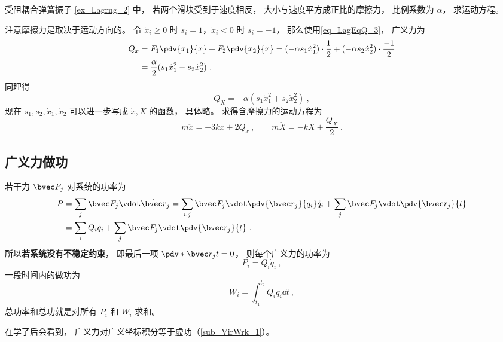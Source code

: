 \begin{example}{受阻耦合弹簧振子}
\autoref{ex_Lagrng_2}  中， 若两个滑块受到于速度相反， 大小与速度平方成正比的摩擦力， 比例系数为 $\alpha$， 求运动方程。

注意摩擦力是取决于运动方向的。 令 $\dot x_i \geqslant 0$ 时 $s_i = 1$，$\dot x_i < 0$ 时 $s_i = -1$， 那么使用\autoref{eq_LagEqQ_3}， 广义力为
\begin{equation}
\begin{aligned}
Q_x &= F_1 \pdv{x_1}{x} + F_2 \pdv{x_2}{x} = (-\alpha s_1\dot x_1^2) \cdot \frac{1}{2} + (-\alpha s_2\dot x_2^2) \cdot \frac{-1}{2}\\
&= \frac{\alpha}{2}(s_1\dot x_1^2 - s_2 \dot x_2^2)~.
\end{aligned}
\end{equation}
同理得
\begin{equation}
Q_X = -\alpha(s_1 \dot x_1^2 + s_2\dot x_2^2)~,
\end{equation}
现在 $s_1,s_2,\dot x_1,\dot x_2$ 可以进一步写成 $\dot x, \dot X$ 的函数， 具体略。 求得含摩擦力的运动方程为
\begin{equation}
m\ddot x =  - 3kx + 2Q_x~, \qquad
m\ddot X =  - kX + \frac{Q_X}{2}~.
\end{equation}
\end{example}

\subsection{广义力做功}\label{sub_LagEqQ_1}
若干力 $\bvec F_j$ 对系统的功率为
\begin{equation}\label{eq_LagEqQ_5}
\begin{aligned}
P &= \sum_j \bvec F_j \vdot \dot{\bvec r}_j
= \sum_{i,j} \bvec F_j \vdot \pdv{\bvec r_j}{q_i}\dot q_i + \sum_j \bvec F_j \vdot \pdv{\bvec r_j}{t}\\
&= \sum_i Q_i \dot q_i + \sum_j \bvec F_j \vdot \pdv{\bvec r_j}{t}~.
\end{aligned}
\end{equation}
所以\textbf{若系统没有不稳定约束}， 即最后一项 $\pdv*{\bvec r_j}{t} = 0$， 则每个广义力的功率为
\begin{equation}
P_i = Q_i \dot q_i~,
\end{equation}
一段时间内的做功为
\begin{equation}
W_i = \int_{t_1}^{t_2} Q_i \dot q_i \dd{t}~,
\end{equation}
总功率和总功就是对所有 $P_i$ 和 $W_i$ 求和。

在学了后会看到， 广义力对广义坐标积分等于虚功（\autoref{sub_VirWrk_1}）。
